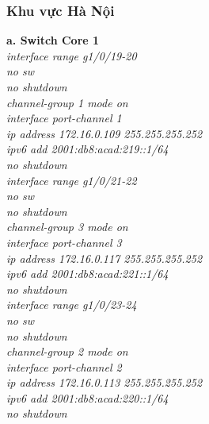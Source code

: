 \documentclass[12pt,a4paper]{report}
\begin{document}
\subsubsection{Khu vực Hà Nội}
\hspace*{1cm}\textbf{a. Switch Core 1}\\
\hspace*{2cm}\textit{interface range g1/0/19-20\\
\hspace*{2cm}no sw\\
\hspace*{2cm}no shutdown\\
\hspace*{2cm}channel-group 1 mode on \\
\hspace*{2cm}interface port-channel 1\\
\hspace*{2cm}ip address 172.16.0.109 255.255.255.252\\
\hspace*{2cm}ipv6 add 2001:db8:acad:219::1/64\\
\hspace*{2cm}no shutdown\\
\hspace*{2cm}interface range g1/0/21-22\\
\hspace*{2cm}no sw\\
\hspace*{2cm}no shutdown\\
\hspace*{2cm}channel-group 3 mode on \\
\hspace*{2cm}interface port-channel 3\\
\hspace*{2cm}ip address 172.16.0.117 255.255.255.252\\
\hspace*{2cm}ipv6 add 2001:db8:acad:221::1/64\\
\hspace*{2cm}no shutdown\\
\hspace*{2cm}interface range g1/0/23-24\\
\hspace*{2cm}no sw\\
\hspace*{2cm}no shutdown\\
\hspace*{2cm}channel-group 2 mode on \\
\hspace*{2cm}interface port-channel 2\\
\hspace*{2cm}ip address 172.16.0.113 255.255.255.252\\
\hspace*{2cm}ipv6 add 2001:db8:acad:220::1/64\\
\hspace*{2cm}no shutdown\\}
\end{document}
